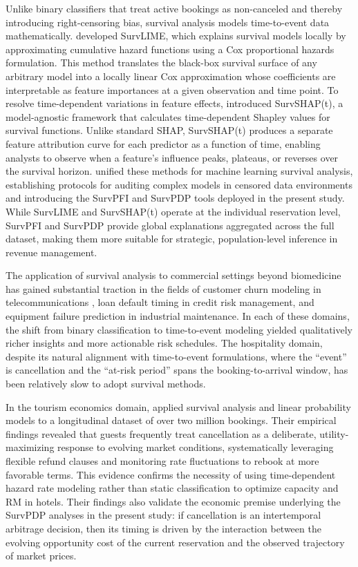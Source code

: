 \documentclass[pdflatex,iicol,sn-mathphys-ay]{sn-jnl}
\theoremstyle{thmstyleone}%
\theoremstyle{thmstyletwo}%
\theoremstyle{thmstylethree}%
\begin{document}
Unlike binary classifiers that treat active bookings as non-canceled and thereby introducing right-censoring bias, survival analysis models time-to-event data mathematically. \cite{kovalev2020survlime} developed SurvLIME, which explains survival models locally by approximating cumulative hazard functions using a Cox proportional hazards formulation. This method translates the black-box survival surface of any arbitrary model into a locally linear Cox approximation whose coefficients are interpretable as feature importances at a given observation and time point. To resolve time-dependent variations in feature effects, \cite{krzyzinski2023survshapt} introduced SurvSHAP(t), a model-agnostic framework that calculates time-dependent Shapley values for survival functions. Unlike standard SHAP, SurvSHAP(t) produces a separate feature attribution curve for each predictor as a function of time, enabling analysts to observe when a feature's influence peaks, plateaus, or reverses over the survival horizon. \cite{langbein2025interpretable} unified these methods for machine learning survival analysis, establishing protocols for auditing complex models in censored data environments and introducing the SurvPFI and SurvPDP tools deployed in the present study. While SurvLIME and SurvSHAP(t) operate at the individual reservation level, SurvPFI and SurvPDP provide global explanations aggregated across the full dataset, making them more suitable for strategic, population-level inference in revenue management.

The application of survival analysis to commercial settings beyond biomedicine has gained substantial traction in the fields of customer churn modeling in telecommunications \citep{kleinbaum2012survival}, loan default timing in credit risk management, and equipment failure prediction in industrial maintenance. In each of these domains, the shift from binary classification to time-to-event modeling yielded qualitatively richer insights and more actionable risk schedules. The hospitality domain, despite its natural alignment with time-to-event formulations, where the ``event'' is cancellation and the ``at-risk period'' spans the booking-to-arrival window, has been relatively slow to adopt survival methods.

In the tourism economics domain, \cite{mir2026decoding} applied survival analysis and linear probability models to a longitudinal dataset of over two million bookings. Their empirical findings revealed that guests frequently treat cancellation as a deliberate, utility-maximizing response to evolving market conditions, systematically leveraging flexible refund clauses and monitoring rate fluctuations to rebook at more favorable terms. This evidence confirms the necessity of using time-dependent hazard rate modeling rather than static classification to optimize capacity and RM in hotels. Their findings also validate the economic premise underlying the SurvPDP analyses in the present study: if cancellation is an intertemporal arbitrage decision, then its timing is driven by the interaction between the evolving opportunity cost of the current reservation and the observed trajectory of market prices.
\end{document}
